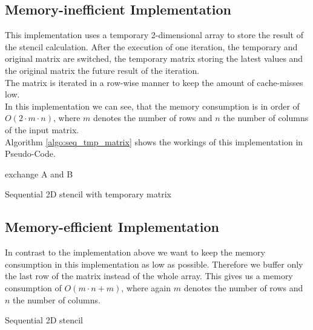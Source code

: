 \documentclass[11pt,a4paper]{article}
\begin{document}
\subsection{Memory-inefficient Implementation}
This implementation uses a temporary 2-dimensional array to store the result of the stencil calculation. After the execution of one iteration, the temporary and original matrix are switched, the temporary matrix storing the latest values and the original matrix the future result of the iteration.\\
The matrix is iterated in a row-wise manner to keep the amount of cache-misses low.\\
In this implementation we can see, that the memory consumption is in order of $O(2 \cdot m \cdot n)$, where $m$ denotes the number of rows and $n$ the number of columns of the input matrix.\\
Algorithm \ref{algo:seq_tmp_matrix} shows the workings of this implementation in Pseudo-Code.

\begin{algorithm}[H] \label{algo:seq_tmp_matrix}
 
  {
  exchange A and B
 }
 \caption{Sequential 2D stencil with temporary matrix}
\end{algorithm}

\subsection{Memory-efficient Implementation} \label{subsec:seq2}
In contrast to the implementation above we want to keep the memory consumption in this implementation as low as possible. Therefore we buffer only the last row of the matrix instead of the whole array. This gives us a memory consumption of $O(m \cdot n + m)$, where again $m$ denotes the number of rows and $n$ the number of columns.\\

\begin{algorithm}[H] \label{algo:seq_one_vec}
 
 \caption{Sequential 2D stencil}
\end{algorithm}
\end{document}
